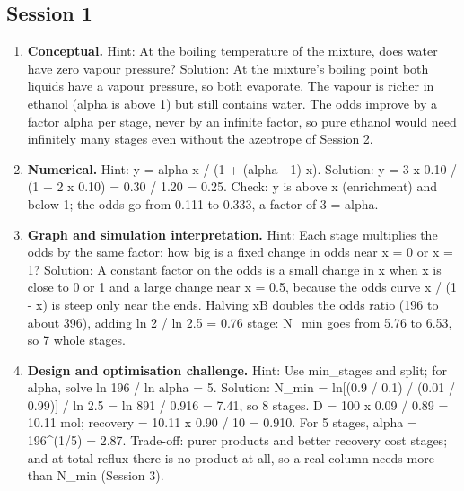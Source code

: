 \documentclass[11pt,a4paper]{article}
\begin{document}
\subsection*{Session 1}
\begin{enumerate}[nosep]
\item \textbf{Conceptual.} Hint: At the boiling temperature of the mixture, does water have zero vapour pressure? Solution: At the mixture's boiling point both liquids have a vapour pressure, so both evaporate. The vapour is richer in ethanol (alpha is above 1) but still contains water. The odds improve by a factor alpha per stage, never by an infinite factor, so pure ethanol would need infinitely many stages even without the azeotrope of Session 2.
\item \textbf{Numerical.} Hint: y = alpha x / (1 + (alpha - 1) x). Solution: y = 3 x 0.10 / (1 + 2 x 0.10) = 0.30 / 1.20 = 0.25. Check: y is above x (enrichment) and below 1; the odds go from 0.111 to 0.333, a factor of 3 = alpha.
\item \textbf{Graph and simulation interpretation.} Hint: Each stage multiplies the odds by the same factor; how big is a fixed change in odds near x = 0 or x = 1? Solution: A constant factor on the odds is a small change in x when x is close to 0 or 1 and a large change near x = 0.5, because the odds curve x / (1 - x) is steep only near the ends. Halving xB doubles the odds ratio (196 to about 396), adding ln 2 / ln 2.5 = 0.76 stage: N\_min goes from 5.76 to 6.53, so 7 whole stages.
\item \textbf{Design and optimisation challenge.} Hint: Use min\_stages and split; for alpha, solve ln 196 / ln alpha = 5. Solution: N\_min = ln[(0.9 / 0.1) / (0.01 / 0.99)] / ln 2.5 = ln 891 / 0.916 = 7.41, so 8 stages. D = 100 x 0.09 / 0.89 = 10.11 mol; recovery = 10.11 x 0.90 / 10 = 0.910. For 5 stages, alpha = 196\textasciicircum{}(1/5) = 2.87. Trade-off: purer products and better recovery cost stages; and at total reflux there is no product at all, so a real column needs more than N\_min (Session 3).
\end{enumerate}
\end{document}
